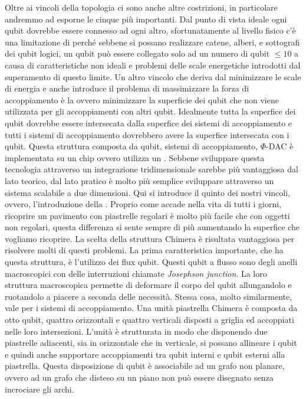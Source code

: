 Oltre ai vincoli della topologia ci sono anche altre costrizioni, in particolare andremmo ad esporne le cinque più importanti. Dal punto di vista ideale ogni qubit dovrebbe essere connesso ad ogni altro, sfortunatamente al livello fisico c'è una limitazione di  perché sebbene si possano realizzare catene, alberi, e sottografi dei qubit logici, un qubit può essere collegato solo ad un numero di qubit $\le 10$ a causa di caratteristiche non ideali e problemi delle scale energetiche introdotti dal superamento di questo limite. Un altro vincolo che deriva dal minimizzare le scale di energia e anche introduce il problema di massimizzare la forza di accoppiamento è la  ovvero minimizzare la superficie dei qubit che non viene utilizzata per gli accoppiamenti con altri qubit. Idealmente tutta la superfice dei qubit dovrebbe essere intersecata dalla superfice dei sistemi di accoppiamento e tutti i sistemi di accoppiamento dovrebbero avere la superfice intersecata con i qubit. Questa struttura composta da qubit, sistemi di accoppiamento, $\Phi$-DAC è implementata su un chip ovvero utilizza un . Sebbene sviluppare questa tecnologia attraverso un integrazione tridimensionale sarebbe più vantaggiosa dal lato teorico, dal lato pratico è molto più semplice sviluppare attraverso un sistema scalabile a due dimensioni. Qui si introduce il quinto dei nostri vincoli, ovvero, l'introduzione della . Proprio come accade nella vita di tutti i giorni, ricoprire un pavimento con piastrelle regolari è molto più facile che con oggetti non regolari, questa differenza si sente sempre di più aumentando la superfice che vogliamo ricoprire.
La scelta della struttura Chimera è risultata vantaggiosa per risolvere molti di questi problemi. La prima caratteristica importante, che ha questa struttura, è l'utilizzo dei flux qubit. Questi qubit a flusso sono degli anelli macroscopici con delle interruzioni chiamate \textit{Josephson junction}. La loro struttura macroscopica permette di deformare il corpo del qubit allungandolo e ruotandolo a piacere a seconda delle necessità. Stessa cosa, molto similarmente, vale per i sistemi di accoppiamento. Una unità piastrella Chimera è composta da otto qubit, quattro orizzontali e quattro verticali disposti a griglia ed accoppiati nelle loro intersezioni. L'unità è strutturata in modo che disponendo due piastrelle adiacenti, sia in orizzontale che in verticale, si possano allineare i qubit e quindi anche supportare accoppiamenti tra qubit interni e qubit esterni alla piastrella. Questa disposizione di qubit è associabile ad un grafo non planare, ovvero ad un grafo che disteso su un piano non può essere disegnato senza incrociare gli archi.
